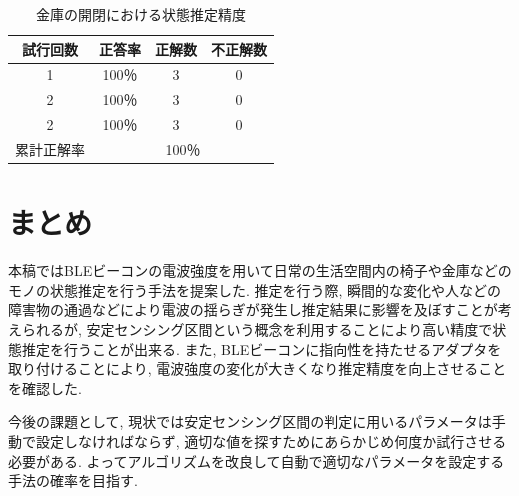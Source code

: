 \documentclass[Japanese]{dicomopapers}
\begin{document}
\begin{table}[htb]
    \begin{center}
        \caption{金庫の開閉における状態推定精度}
        \label{kinko_fig}
        \begin{tabular}{|c|c|c|c|} \hline
        試行回数 & 正答率 & 正解数 & 不正解数 \\ \hline
        1 & 100％ & 3 & 0 \\ \hline
        2 & 100％ & 3 & 0 \\ \hline
        2 & 100％ & 3 & 0 \\ \hline \hline
        累計正解率 & \multicolumn{3}{c|}{100％} \\ \hline
        \end{tabular}
    \end{center}
\end{table}


\section{まとめ}
本稿ではBLEビーコンの電波強度を用いて日常の生活空間内の椅子や金庫などのモノの状態推定を行う手法を提案した.
推定を行う際, 瞬間的な変化や人などの障害物の通過などにより電波の揺らぎが発生し推定結果に影響を及ぼすことが考えられるが, 安定センシング区間という概念を利用することにより高い精度で状態推定を行うことが出来る.
また, BLEビーコンに指向性を持たせるアダプタを取り付けることにより, 電波強度の変化が大きくなり推定精度を向上させることを確認した.

今後の課題として, 現状では安定センシング区間の判定に用いるパラメータは手動で設定しなければならず, 適切な値を探すためにあらかじめ何度か試行させる必要がある.
よってアルゴリズムを改良して自動で適切なパラメータを設定する手法の確率を目指す.


\end{document}
